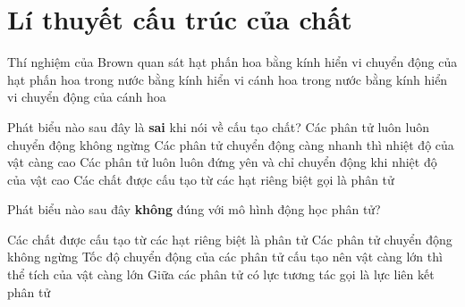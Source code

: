 \section{Lí thuyết cấu trúc của chất}
\begin{ex}%
	Thí nghiệm của Brown quan sát
	\choice
	{hạt phấn hoa bằng kính hiển vi}
	{\True chuyển động của hạt phấn hoa trong nước bằng kính hiển vi}
	{cánh hoa trong nước bằng kính hiển vi}
	{chuyển động của cánh hoa}
\end{ex}






\begin{ex}%
	Phát biểu nào sau đây là \textbf{sai} khi nói về cấu tạo chất?	
	\choice
	{Các phân tử luôn luôn chuyển động không ngừng}
	{Các phân tử chuyển động càng nhanh thì nhiệt độ của vật càng cao}
	{\True Các phân tử luôn luôn đứng yên và chỉ chuyển động khi nhiệt độ của vật cao}
	{Các chất được cấu tạo từ các hạt riêng biệt gọi là phân tử}
	\end{ex}






\begin{ex}%
	Phát biểu nào sau đây \textbf{không} đúng với mô hình động học phân tử?
	
	\choice
	{Các chất được cấu tạo từ các hạt riêng biệt là phân tử}
	{Các phân tử chuyển động không ngừng}
	{\True Tốc độ chuyển động của các phân tử cấu tạo nên vật càng lớn thì thể tích của vật càng lớn}
	{Giữa các phân tử có lực tương tác gọi là lực liên kết phân tử}
	\end{ex}






